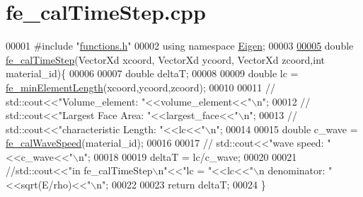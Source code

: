 \hypertarget{fe__cal_time_step_8cpp_source}{}\section{fe\+\_\+cal\+Time\+Step.\+cpp}
\label{fe__cal_time_step_8cpp_source}

\begin{DoxyCode}
00001 \textcolor{preprocessor}{#include "\hyperlink{functions_8h}{functions.h}"}
00002 \textcolor{keyword}{using namespace }\hyperlink{namespace_eigen}{Eigen};
00003 
\hyperlink{fe__cal_time_step_8cpp_a295b08cc71d5af080f0450614a01a4e6}{00005} \textcolor{keywordtype}{double} \hyperlink{fe__cal_time_step_8cpp_a295b08cc71d5af080f0450614a01a4e6}{fe\_calTimeStep}(VectorXd xcoord, VectorXd ycoord, VectorXd zcoord,\textcolor{keywordtype}{int} material\_id)\{
00006 
00007     \textcolor{keywordtype}{double} deltaT;
00008 
00009     \textcolor{keywordtype}{double} lc = \hyperlink{functions_8h_a6b04cfa4d2533eed9667ae14f361baa6}{fe\_minElementLength}(xcoord,ycoord,zcoord);
00010 
00011     \textcolor{comment}{// std::cout<<"Volume\_element: "<<volume\_element<<"\(\backslash\)n";}
00012     \textcolor{comment}{// std::cout<<"Largest Face Area: "<<largest\_face<<"\(\backslash\)n";}
00013     \textcolor{comment}{// std::cout<<"characteristic Length: "<<lc<<"\(\backslash\)n";}
00014 
00015     \textcolor{keywordtype}{double} c\_wave = \hyperlink{functions_8h_a20aed1a2d3d8b470592491a96e60be87}{fe\_calWaveSpeed}(material\_id);
00016 
00017     \textcolor{comment}{// std::cout<<"wave speed: "<<c\_wave<<"\(\backslash\)n";}
00018 
00019     deltaT = lc/c\_wave;
00020 
00021     \textcolor{comment}{//std::cout<<"in fe\_calTimeStep\(\backslash\)n"<<"lc = "<<lc<<"\(\backslash\)n denominator: "<<sqrt(E/rho)<<"\(\backslash\)n";}
00022 
00023     \textcolor{keywordflow}{return} deltaT;
00024 \}
\end{DoxyCode}
